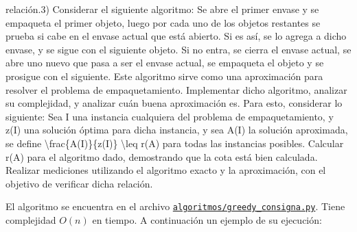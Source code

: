 \documentclass[11pt]{article}
\begin{document}
{{{relación.}{3) Considerar el siguiente algoritmo: Se abre el primer envase y se empaqueta el primer objeto, luego por cada uno de los objetos restantes se prueba si cabe en el envase actual que está abierto. Si es así, se lo agrega a dicho envase, y se sigue con el siguiente objeto. Si no entra, se cierra el envase actual, se abre uno nuevo que pasa a ser el envase actual, se empaqueta el objeto y se prosigue con el siguiente.   Este algoritmo sirve como una aproximación para resolver el problema de empaquetamiento. Implementar dicho algoritmo, analizar su complejidad, y analizar cuán buena aproximación es. Para esto, considerar lo siguiente: Sea I una instancia cualquiera del problema de empaquetamiento, y z(I) una solución óptima para dicha instancia, y sea A(I) la solución aproximada, se define \textbackslash frac\{A(I)\}\{z(I)\} \textbackslash leq r(A) para todas las instancias posibles. Calcular r(A) para el algoritmo dado, demostrando que la cota está bien calculada. Realizar mediciones utilizando el algoritmo exacto y la aproximación, con el objetivo de verificar dicha relación.}}\label{considerar-el-siguiente-algoritmo-se-abre-el-primer-envase-y-se-empaqueta-el-primer-objeto-luego-por-cada-uno-de-los-objetos-restantes-se-prueba-si-cabe-en-el-envase-actual-que-estuxe1-abierto.-si-es-asuxed-se-lo-agrega-a-dicho-envase-y-se-sigue-con-el-siguiente-objeto.-si-no-entra-se-cierra-el-envase-actual-se-abre-uno-nuevo-que-pasa-a-ser-el-envase-actual-se-empaqueta-el-objeto-y-se-prosigue-con-el-siguiente.-este-algoritmo-sirve-como-una-aproximaciuxf3n-para-resolver-el-problema-de-empaquetamiento.-implementar-dicho-algoritmo-analizar-su-complejidad-y-analizar-cuuxe1n-buena-aproximaciuxf3n-es.-para-esto-considerar-lo-siguiente-sea-i-una-instancia-cualquiera-del-problema-de-empaquetamiento-y-zi-una-soluciuxf3n-uxf3ptima-para-dicha-instancia-y-sea-ai-la-soluciuxf3n-aproximada-se-define-fracaizi-leq-ra-para-todas-las-instancias-posibles.-calcular-ra-para-el-algoritmo-dado-demostrando-que-la-cota-estuxe1-bien-calculada.-realizar-mediciones-utilizando-el-algoritmo-exacto-y-la-aproximaciuxf3n-con-el-objetivo-de-verificar-dicha-relaciuxf3n.}}

    El algoritmo se encuentra en el archivo
\href{algoritmos/greedy_consigna.py}{\texttt{algoritmos/greedy\_consigna.py}}.
Tiene complejidad \(O(n)\) en tiempo. A continuación un ejemplo de su
ejecución:
\end{document}
